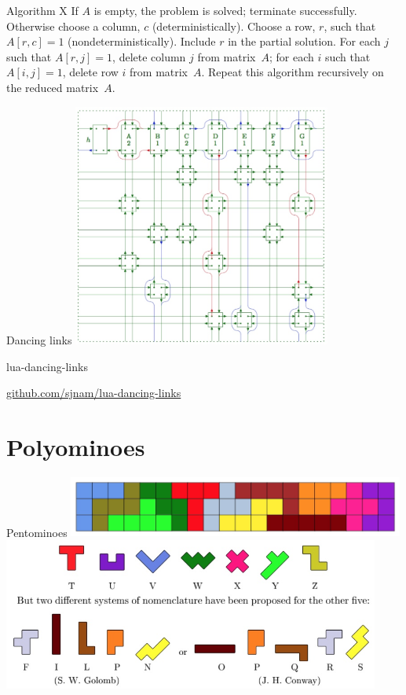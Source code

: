 \documentclass{beamer}
\begin{document}
\begin{frame}[fragile]{Algorithm X}
  \begingroup\obeylines
  \baselineskip10pt
If $A$ is empty, the problem is solved; terminate successfully.
Otherwise choose a column, $c$ (deterministically).
Choose a row, $r$, such that $A[r,c]=1$ (nondeterministically).
Include $r$ in the partial solution.
For each $j$ such that $A[r,j]=1$,
\qquad delete column $j$ from matrix~$A$;
\qquad for each $i$ such that $A[i,j]=1$,
\qquad\qquad delete row $i$ from matrix~$A$.
Repeat this algorithm recursively on the reduced matrix~$A$.
\endgroup
\end{frame}

%
\begin{frame}{Dancing links}
\centering\includegraphics[height=8cm]{dlx.jpg}
\end{frame}

%
\begin{frame}{lua-dancing-links}
\vfill
\begin{center}
\Large
  \href{https://github.com/sjnam/lua-dancing-links}
    {github.com/sjnam/lua-dancing-links}
\end{center}
\vfill
\end{frame}

\section{Polyominoes}

%
\begin{frame}{Pentominoes}
\centering\includegraphics[height=2cm]{3x20.jpg}
\vspace{10mm}
\mbox{\hskip-1cm\includegraphics[height=5cm]{pentominoes.jpg}}
\end{frame}
\end{document}
